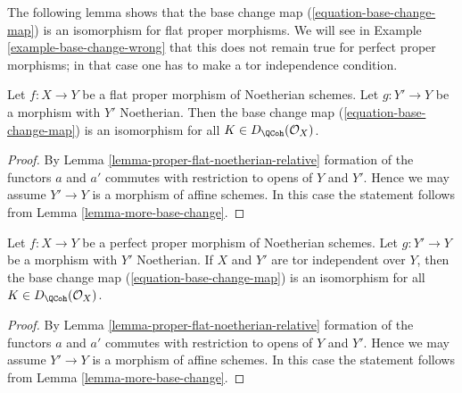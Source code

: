 \noindent
The following lemma shows that the base change map
(\ref{equation-base-change-map}) is an isomorphism
for flat proper morphisms. We will see in
Example \ref{example-base-change-wrong}
that this does not remain true for perfect proper morphisms;
in that case one has to make a tor independence condition.

\begin{lemma}
\label{lemma-proper-flat-base-change}
Let $f : X \to Y$ be a flat proper morphism of Noetherian schemes.
Let $g : Y' \to Y$ be a morphism with $Y'$ Noetherian. Then the base
change map (\ref{equation-base-change-map}) is an isomorphism
for all $K \in D_\QCoh(\mathcal{O}_X)$.
\end{lemma}

\begin{proof}
By Lemma \ref{lemma-proper-flat-noetherian-relative} formation of the
functors $a$ and $a'$ commutes with restriction to opens of $Y$ and $Y'$.
Hence we may assume $Y' \to Y$ is a morphism of affine schemes. In this
case the statement follows from Lemma \ref{lemma-more-base-change}.
\end{proof}

\begin{lemma}
\label{lemma-proper-perfect-base-change}
Let $f : X \to Y$ be a perfect proper morphism of Noetherian schemes.
Let $g : Y' \to Y$ be a morphism with $Y'$ Noetherian. If $X$ and
$Y'$ are tor independent over $Y$, then the base
change map (\ref{equation-base-change-map}) is an isomorphism
for all $K \in D_\QCoh(\mathcal{O}_X)$.
\end{lemma}

\begin{proof}
By Lemma \ref{lemma-proper-flat-noetherian-relative} formation of the
functors $a$ and $a'$ commutes with restriction to opens of $Y$ and $Y'$.
Hence we may assume $Y' \to Y$ is a morphism of affine schemes. In this
case the statement follows from Lemma \ref{lemma-more-base-change}.
\end{proof}

